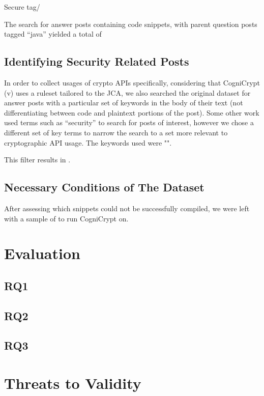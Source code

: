 \documentclass[10pt, conference]{IEEEtran}
\begin{document}
Secure tag/

The search for answer posts containing code snippets, with parent question posts tagged “java” yielded a total of 

\subsection{Identifying Security Related Posts}
In order to collect usages of crypto APIs specifically, considering that CogniCrypt (v) uses a ruleset tailored to the JCA, we also searched the original dataset for answer posts with a particular set of keywords in the body of their text (not differentiating between code and plaintext portions of the post). Some other work \cite{Meng:2018:SCP:3180155.3180201} used terms such as “security” to search for posts of interest, however we chose a different set of key terms to narrow the search to a set more relevant to cryptographic API usage. The keywords used were "". 

This filter results in .
 

\subsection{Necessary Conditions of The Dataset}


After assessing which snippets could not be successfully compiled, we were left with a sample of to run CogniCrypt on. 

\section{Evaluation}

\subsection{RQ1}




\subsection{RQ2}






\subsection{RQ3}



\section{Threats to Validity}
\end{document}
